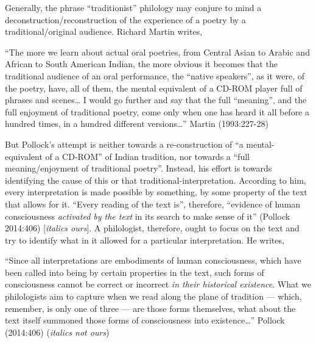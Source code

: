 Generally, the phrase “traditionist” philology may conjure to mind a deconstruction/reconstruction of the experience of a poetry by a traditional/original audience. Richard Martin writes,

\begin{myquote}
“The more we learn about actual oral poetries, from Central Asian to Arabic and African to South American Indian, the more obvious it becomes that the traditional audience of an oral performance, the “native speakers”, as it were, of the poetry, have, all of them, the mental equivalent of a CD-ROM player full of phrases and scenes… I would go further and say that the full “meaning”, and the full enjoyment of traditional poetry, come only when one has heard it all before a hundred times, in a hundred different versions…” 	
\hfill Martin (1993:227-28)
\end{myquote}

But Pollock’s attempt is neither towards a re-construction of “a mental-equivalent of a CD-ROM” of Indian tradition, nor towards a “full meaning/enjoyment of traditional poetry”. Instead, his effort is towards identifying the cause of this or that traditional-interpretation. According to him, every interpretation is made possible by something, by some property of the text that allows for it. “Every reading of the text is”, therefore, “evidence of human consciousness {\sl activated by the text} in its search to make sense of it” (Pollock 2014:406) [{\sl italics ours}]. A philologist, therefore, ought to focus on the text and try to identify what in it allowed for a particular interpretation. He writes,

\begin{myquote}
“Since all interpretations are embodiments of human consciousness, which have been called into being by certain properties in the text, such forms of consciousness cannot be correct or incorrect {\sl in their historical existence}. What we philologists aim to capture when we read along the plane of tradition --- which, remember, is only one of three --- are those forms themselves, what about the text itself summoned those forms of consciousness into existence…”
\hfill Pollock (2014:406) ({\sl italics not ours})
\end{myquote}

